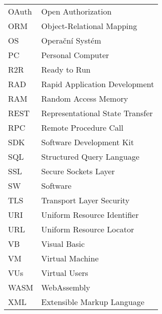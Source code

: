 \begin{tabular}{ll}
OAuth & Open Authorization \\
ORM & Object-Relational Mapping \\
OS & Operační Systém \\
PC & Personal Computer \\
R2R & Ready to Run \\
RAD & Rapid Application Development \\
RAM & Random Access Memory \\
REST & Representational State Transfer \\
RPC & Remote Procedure Call \\
SDK & Software Development Kit \\
SQL & Structured Query Language \\
SSL & Secure Sockets Layer \\
SW & Software \\
TLS & Transport Layer Security \\
URI & Uniform Resource Identifier \\
URL & Uniform Resource Locator \\
VB & Visual Basic \\
VM & Virtual Machine \\
VUs & Virtual Users \\
WASM & WebAssembly \\
XML & Extensible Markup Language \\
\end{tabular}

